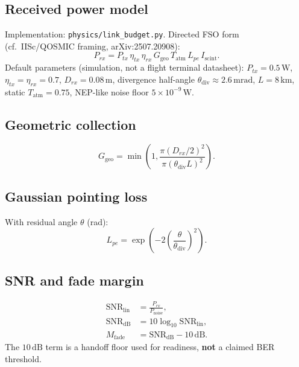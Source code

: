 \documentclass[11pt,a4paper]{article}
\begin{document}
\subsection{Received power model}
Implementation: \texttt{physics/link\_budget.py}.
Directed FSO form (cf.\ IISc/QOSMIC framing, arXiv:2507.20908):
\begin{equation}
P_{rx}
=
P_{tx}\,
\eta_{tx}\,
\eta_{rx}\,
G_{\mathrm{geo}}\,
T_{\mathrm{atm}}\,
L_{pe}\,
I_{\mathrm{scint}}.
\end{equation}
Default parameters (simulation, not a flight terminal datasheet):
$P_{tx}=0.5\,\mathrm{W}$,
$\eta_{tx}=\eta_{rx}=0.7$,
$D_{rx}=0.08\,\mathrm{m}$,
divergence half-angle $\theta_{\mathrm{div}}\approx 2.6\,\mathrm{mrad}$,
$L=8\,\mathrm{km}$,
static $T_{\mathrm{atm}}=0.75$,
NEP-like noise floor $5\times 10^{-9}\,\mathrm{W}$.

\subsection{Geometric collection}
\begin{equation}
G_{\mathrm{geo}}
=
\min\!\left(1,\frac{\pi (D_{rx}/2)^2}{\pi (\theta_{\mathrm{div}} L)^2}\right).
\end{equation}

\subsection{Gaussian pointing loss}
With residual angle $\theta$ (rad):
\begin{equation}
L_{pe}
=
\exp\!\left(-2\left(\frac{\theta}{\theta_{\mathrm{div}}}\right)^2\right).
\end{equation}

\subsection{SNR and fade margin}
\begin{align}
\mathrm{SNR}_{\mathrm{lin}}
&=
\frac{P_{rx}}{P_{\mathrm{noise}}},\\
\mathrm{SNR}_{\mathrm{dB}}
&=
10\log_{10}\mathrm{SNR}_{\mathrm{lin}},\\
M_{\mathrm{fade}}
&=
\mathrm{SNR}_{\mathrm{dB}}-10\,\mathrm{dB}.
\end{align}
The $10\,\mathrm{dB}$ term is a handoff floor used for readiness, \textbf{not} a claimed BER threshold.
\end{document}
